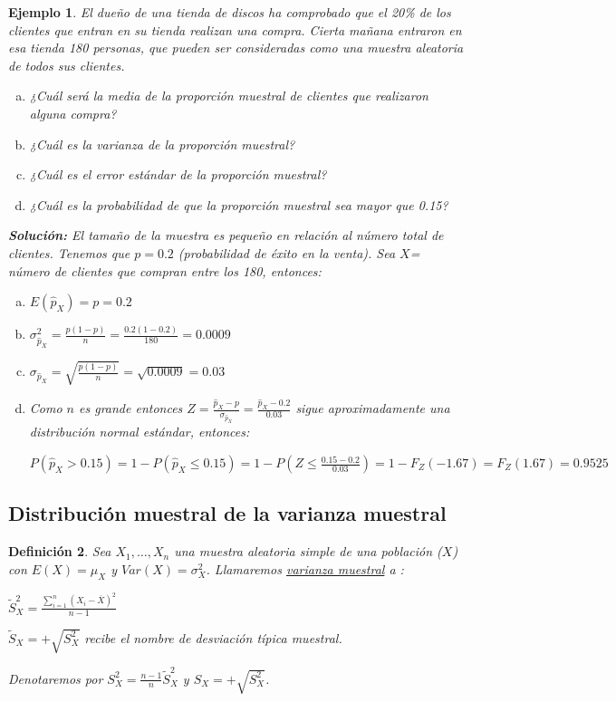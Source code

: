\documentclass[12pt]{report}
\newtheorem{definition}{Definici\'on}
\newtheorem{example}[definition]{Ejemplo}
\begin{document}
     \begin{example}

        El dueño de una tienda de discos ha comprobado que el 20\% de los
    clientes que entran en su tienda realizan una compra. Cierta mañana
    entraron en esa tienda 180 personas, que pueden ser consideradas como
    una muestra aleatoria de todos sus clientes.
        \begin{enumerate}[a)]
        \item ¿Cuál será la media de la proporción muestral de clientes
        que realizaron alguna compra?
        \item ¿Cuál es la varianza de la proporción muestral?
        \item ¿Cuál es el error estándar de la proporción muestral?
        \item ¿Cuál es la probabilidad de que la proporción muestral sea
        mayor que 0.15?
        \end{enumerate}


   \textbf{Solución:}
    El tamaño de la muestra es pequeño en relación al
    número total de clientes. Tenemos que $p=0.2$ (probabilidad
    de éxito en la venta). Sea $X$= número de
    clientes que compran entre los 180, entonces:
\begin{enumerate}[a)]
  \item $E(\hat{p}_{X})=p=0.2$

  \item $\sigma_{\hat{p}_{X}}^2= \frac{ p(1-p)}{n}=\frac{0.2
    (1-0.2)}{180}=0.0009$

  \item $\sigma_{\hat{p}_{X}}=\sqrt{\frac{ p(1-p)}{n}}=\sqrt{0.0009}=0.03$
    \item Como $n$  es grande entonces
    $Z=\frac{\hat{p}_{X}-p}{\sigma_{\hat{p}_{X}}}=\frac{\hat{p}_{X}-0.2}{0.03}$
 sigue aproximadamente una distribución normal estándar, entonces:

 $P(\hat{p}_{X}>0.15)=1-P(\hat{p}_{X}\leq 0.15)= 1-P(Z\leq
 \frac{0.15-0.2}{0.03})=1-F_{Z}( -1.67)=F_{Z}(1.67)=0.9525$
\end{enumerate}
 \end{example}

    \subsection{Distribución muestral de la varianza muestral}

\begin{definition}
Sea $X_{1},\ldots, X_{n}$ una muestra aleatoria simple de una población ($X$) con
$E(X)=\mu_{X}$ y $Var(X)=\sigma_{X}^2$. Llamaremos
\underline{ \emph{varianza muestral}} a :

$\tilde{S}_{X}^2=\frac{\sum_{i=1}^n (X_{i}-\overline{X})^2}{n-1}$

$\tilde{S}_{X}=+\sqrt{S_{X}^2}$ recibe el nombre de desviación típica muestral.

Denotaremos por $S^2_{X}=\frac{n-1}{n}\tilde{S}^2_{X}$ y $S_X=+\sqrt{S_X^2}$.

\end{definition}
\end{document}

